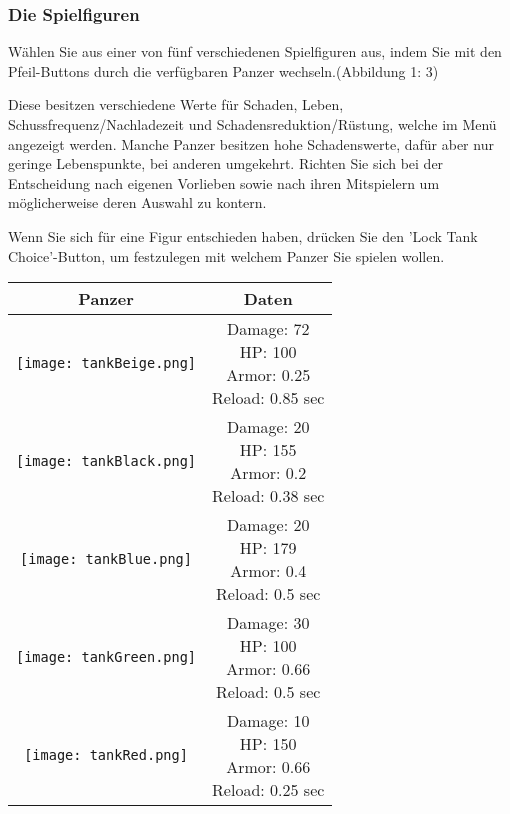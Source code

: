 \documentclass[a4paper]{article}
\begin{document}
\newpage
\subsubsection{Die Spielfiguren}
Wählen Sie aus einer von fünf verschiedenen Spielfiguren aus, indem Sie mit den Pfeil-Buttons durch die verfügbaren Panzer wechseln.(Abbildung 1: 3) 

Diese besitzen verschiedene Werte für Schaden, Leben, Schussfrequenz/Nachladezeit und Schadensreduktion/Rüstung, welche im Menü angezeigt werden. Manche Panzer besitzen hohe Schadenswerte, dafür aber nur geringe Lebenspunkte, bei anderen umgekehrt. Richten Sie sich bei der Entscheidung nach eigenen Vorlieben sowie nach ihren Mitspielern um möglicherweise deren Auswahl zu kontern.


Wenn Sie sich für eine Figur entschieden haben, drücken Sie den 'Lock Tank Choice'-Button, um festzulegen mit welchem Panzer Sie spielen wollen.



\begin{tabular}{|c|c|}
\hline 
\textbf{Panzer} & \textbf{Daten} \\ 
\hline 
\texttt{[image: tankBeige.png]} & 
\parbox[c]{5cm}{Damage: 72 \\ HP: 100 \\ Armor: 0.25 \\ Reload: 0.85 sec\\}
\\ 
\hline 
\texttt{[image: tankBlack.png]} & \parbox[c]{5cm}{Damage: 20 \\HP: 155 \\  Armor: 0.2 \\ Reload: 0.38 sec\\} \\ 
\hline 
\texttt{[image: tankBlue.png]} & \parbox[c]{5cm}{Damage: 20\\HP: 179 \\  Armor: 0.4\\ Reload: 0.5 sec\\} \\ 
\hline 
\texttt{[image: tankGreen.png]} & \parbox[c]{5cm}{Damage: 30\\HP: 100\\  Armor: 0.66\\ Reload: 0.5 sec\\} \\ 
\hline 
\texttt{[image: tankRed.png]} & \parbox[c]{5cm}{Damage: 10\\HP: 150\\  Armor: 0.66\\ Reload: 0.25 sec\\} \\ 
\hline 
\end{tabular} 
\end{document}
